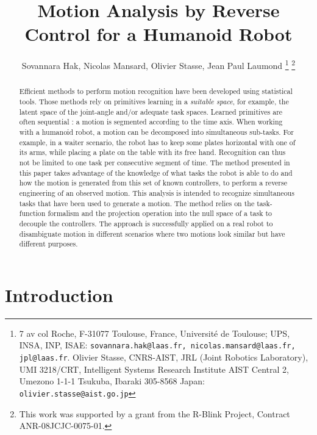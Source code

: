 \documentclass[letterpaper, 10pt, conference]{ieeeconf}      %
\title{\LARGE \bf
Motion Analysis by Reverse Control for a Humanoid Robot
}
\author{Sovannara Hak, Nicolas Mansard, Olivier Stasse, Jean Paul Laumond%
  \thanks{7 av col Roche, F-31077 Toulouse, France, Universit\'e de Toulouse; UPS, INSA, INP,
    ISAE: {\tt\small sovannara.hak@laas.fr, nicolas.mansard@laas.fr, jpl@laas.fr}. Olivier
    Stasse, CNRS-AIST, JRL (Joint Robotics Laboratory), UMI 3218/CRT,
    Intelligent Systems Research Institute AIST Central 2, Umezono 1-1-1
    Tsukuba, Ibaraki 305-8568 Japan: {\tt\small olivier.stasse@aist.go.jp}}
  \thanks{This work was supported by a grant from the R-Blink Project, Contract
    ANR-08JCJC-0075-01.}  }
\begin{document}
\maketitle
\thispagestyle{empty}
\pagestyle{empty}


\begin{abstract}
Efficient methods to perform motion recognition have been developed
using statistical tools. Those methods rely on primitives learning
in a \emph{suitable space}, for example, the latent space of the joint-angle and/or adequate task spaces.
Learned primitives are often sequential : a motion is segmented according to the time axis.
When working with a humanoid robot, a motion can be decomposed into
simultaneous sub-tasks. For example, in a waiter scenario,
the robot has to keep some plates horizontal with one of its arms, while placing a plate
on the table with its free hand.
Recognition can thus not be limited to one task per consecutive segment of 
time.
The method presented in this paper
takes advantage of the knowledge of what tasks the robot is able to do and how
the motion is generated from this set of known controllers, to perform a reverse engineering of an
observed motion. This analysis is intended to recognize simultaneous tasks that
have been used to generate a motion. The method relies
on the task-function formalism and the projection operation into the null space of a task to decouple
the controllers.
The approach is successfully applied on a real robot
to disambiguate motion in different scenarios where two motions look similar but have
different purposes.
\end{abstract}

\section{Introduction}
\end{document}
